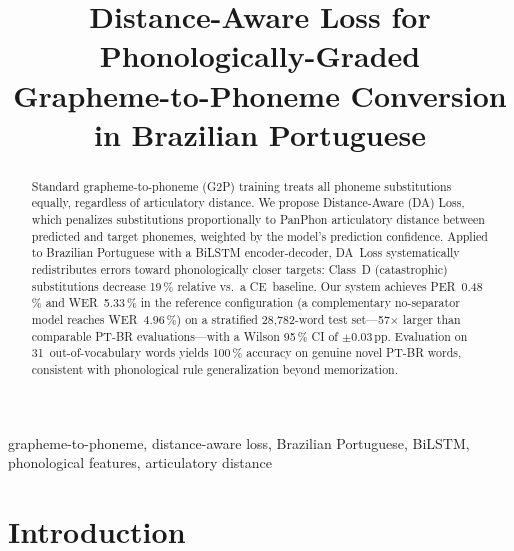 \documentclass[conference]{IEEEtran}
\begin{document}

\title{Distance-Aware Loss for Phonologically-Graded\\
       Grapheme-to-Phoneme Conversion in Brazilian Portuguese}

\author{%
}

\maketitle

\begin{abstract}
Standard grapheme-to-phoneme (G2P) training treats all phoneme
substitutions equally, regardless of articulatory distance.
We propose Distance-Aware (DA) Loss, which penalizes substitutions
proportionally to PanPhon articulatory distance between predicted and
target phonemes, weighted by the model's prediction confidence.
Applied to Brazilian Portuguese with a BiLSTM encoder-decoder,
DA~Loss systematically redistributes errors toward phonologically
closer targets: Class~D (catastrophic) substitutions decrease
19\,\% relative vs.\ a CE~baseline.
Our system achieves PER~0.48\,\% and WER~5.33\,\% in the reference
configuration (a complementary no-separator model reaches
WER~4.96\,\%) on a stratified 28{,}782-word test
set---57$\times$ larger than comparable PT-BR evaluations---with
a Wilson 95\,\% CI of $\pm$0.03\,pp.
Evaluation on 31~out-of-vocabulary words yields 100\,\% accuracy
on genuine novel PT-BR words, consistent with phonological rule
generalization beyond memorization.
\end{abstract}

\begin{IEEEkeywords}
grapheme-to-phoneme, distance-aware loss, Brazilian Portuguese,
BiLSTM, phonological features, articulatory distance
\end{IEEEkeywords}

\section{Introduction}
\end{document}

